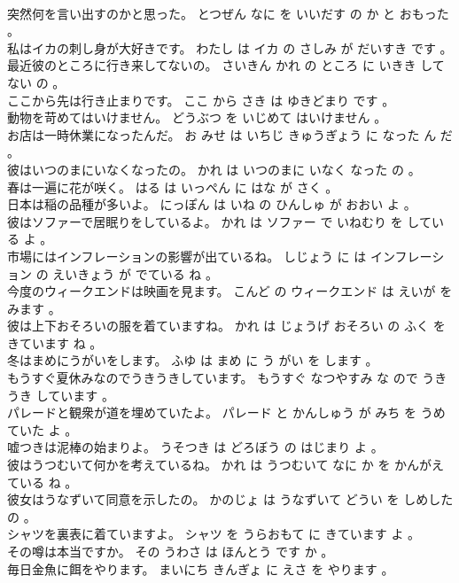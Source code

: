 \documentclass[8pt]{extreport}
\begin{document}
\begin{CJK}{UTF8}{min}
\\	突然何を言い出すのかと思った。	とつぜん なに を いいだす の か と おもった 。 
\\	私はイカの刺し身が大好きです。	わたし は イカ の さしみ が だいすき です 。 
\\	最近彼のところに行き来してないの。	さいきん かれ の ところ に いきき してない の 。 
\\	ここから先は行き止まりです。	ここ から さき は ゆきどまり です 。 
\\	動物を苛めてはいけません。	どうぶつ を いじめて はいけません 。 
\\	お店は一時休業になったんだ。	お みせ は いちじ きゅうぎょう に なった ん だ 。 
\\	彼はいつのまにいなくなったの。	かれ は いつのまに いなく なった の 。 
\\	春は一遍に花が咲く。	はる は いっぺん に はな が さく 。 
\\	日本は稲の品種が多いよ。	にっぽん は いね の ひんしゅ が おおい よ 。 
\\	彼はソファーで居眠りをしているよ。	かれ は ソファー で いねむり を している よ 。 
\\	市場にはインフレーションの影響が出ているね。	しじょう に は インフレーション の えいきょう が でている ね 。 
\\	今度のウィークエンドは映画を見ます。	こんど の ウィークエンド は えいが を みます 。 
\\	彼は上下おそろいの服を着ていますね。	かれ は じょうげ おそろい の ふく を きています ね 。 
\\	冬はまめにうがいをします。	ふゆ は まめ に う がい を します 。 
\\	もうすぐ夏休みなのでうきうきしています。	もうすぐ なつやすみ な ので うきうき しています 。 
\\	パレードと観衆が道を埋めていたよ。	パレード と かんしゅう が みち を うめていた よ 。 
\\	嘘つきは泥棒の始まりよ。	うそつき は どろぼう の はじまり よ 。 
\\	彼はうつむいて何かを考えているね。	かれ は うつむいて なに か を かんがえている ね 。 
\\	彼女はうなずいて同意を示したの。	かのじょ は うなずいて どうい を しめした の 。 
\\	シャツを裏表に着ていますよ。	シャツ を うらおもて に きています よ 。 
\\	その噂は本当ですか。	その うわさ は ほんとう です か 。 
\\	毎日金魚に餌をやります。	まいにち きんぎょ に えさ を やります 。 

\end{CJK}
\end{document}
